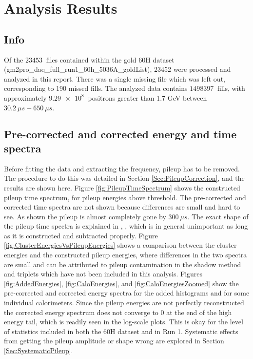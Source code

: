 
\graphicspath{ {Figures/Pileup/Energies/} {Figures/Pileup/TimeSpectra/} {Figures/Main/} {Figures/ResidualsFFT/} {Figures/FitStartScans/} {Figures/FitEndScans/} {Figures/PerCalo/} }

\chapter{Analysis Results}
\label{Ch:Results}

\section{Info}

Of the $\SI{23453}{}$ files contained within the gold 60H dataset (gm2pro\_daq\_full\_run1\_60h\_5036A\_goldList), 23452 were processed and analyzed in this report. There was a single missing file which was left out, corresponding to 190 missed fills. The analyzed data contains $\SI{1498397}{}$ fills, with approximately $\SI{9.29e8}{}$ positrons greater than 1.7 GeV between $\SI{30.2}{\mu s} - \SI{650}{\mu s}$.

\section{Pre-corrected and corrected energy and time spectra}

	Before fitting the data and extracting the \gmtwo frequency, pileup has to be removed. The procedure to do this was detailed in Section \ref{Sec:PileupCorrection}, and the results are shown here. Figure \ref{fig:PileupTimeSpectrum} shows the constructed pileup time spectrum, for pileup energies above threshold. The pre-corrected and corrected time spectra are not shown because differences are small and hard to see. As shown the pileup is almost completely gone by $\SI{300}{\mu s}$. The exact shape of the pileup time spectra is explained in , \cite{Pileup1}, which is in general unimportant as long as it is constructed and subtracted properly. Figure \ref{fig:ClusterEnergiesVsPileupEnergies} shows a comparison between the cluster energies and the constructed pileup energies, where differences in the two spectra are small and can be attributed to pileup contamination in the shadow method and triplets which have not been included in this analysis. Figures \ref{fig:AddedEnergies}, \ref{fig:CaloEnergies}, and \ref{fig:CaloEnergiesZoomed} show the pre-corrected and corrected energy spectra for the added histograms and for some individual calorimeters. Since the pileup energies are not perfectly reconstructed the corrected energy spectrum does not converge to 0 at the end of the high energy tail, which is readily seen in the log-scale plots. This is okay for the level of statistics included in both the 60H dataset and in Run 1. Systematic effects from getting the pileup amplitude or shape wrong are explored in Section \ref{Sec:SystematicPileup}.

